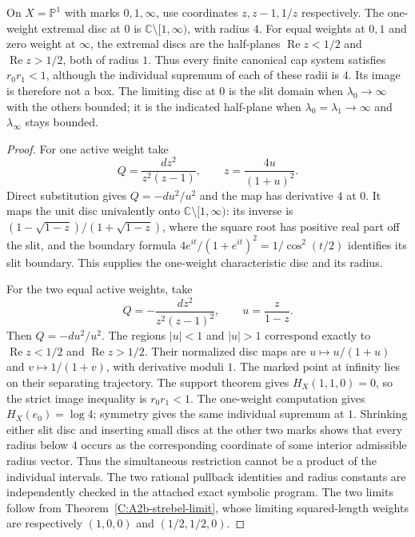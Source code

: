 \begin{proposition}
\label{C:A2b-pants-extremes}
On $X=\mathbb P^1$ with marks $0,1,\infty$, use coordinates $z,z-1,1/z$ respectively. The one-weight extremal disc at $0$ is $\mathbb C\setminus[1,\infty)$, with radius $4$. For equal weights at $0,1$ and zero weight at $\infty$, the extremal discs are the half-planes $\operatorname{Re}z<1/2$ and $\operatorname{Re}z>1/2$, both of radius $1$. Thus every finite canonical cap system satisfies $r_0r_1<1$, although the individual supremum of each of these radii is $4$. Its image is therefore not a box. The limiting disc at $0$ is the slit domain when $\lambda_0\to\infty$ with the others bounded; it is the indicated half-plane when $\lambda_0=\lambda_1\to\infty$ and $\lambda_\infty$ stays bounded.
\end{proposition}
\begin{proof}
For one active weight take
\[
 Q=\frac{dz^2}{z^2(z-1)},\qquad
 z=\frac{4u}{(1+u)^2}.
\]
Direct substitution gives $Q=-du^2/u^2$ and the map has derivative $4$ at $0$. It maps the unit disc univalently onto $\mathbb C\setminus[1,\infty)$: its inverse is $(1-\sqrt{1-z})/(1+\sqrt{1-z})$, where the square root has positive real part off the slit, and the boundary formula $4e^{it}/(1+e^{it})^2=1/\cos^2(t/2)$ identifies its slit boundary. This supplies the one-weight characteristic disc and its radius.

For the two equal active weights, take
\[
 Q=-\frac{dz^2}{z^2(z-1)^2},\qquad u=\frac{z}{1-z}.
\]
Then $Q=-du^2/u^2$. The regions $|u|<1$ and $|u|>1$ correspond exactly to $\operatorname{Re}z<1/2$ and $\operatorname{Re}z>1/2$. Their normalized disc maps are $u\mapsto u/(1+u)$ and $v\mapsto1/(1+v)$, with derivative moduli $1$. The marked point at infinity lies on their separating trajectory. The support theorem gives $H_X(1,1,0)=0$, so the strict image inequality is $r_0r_1<1$. The one-weight computation gives $H_X(e_0)=\log4$; symmetry gives the same individual supremum at $1$. Shrinking either slit disc and inserting small discs at the other two marks shows that every radius below $4$ occurs as the corresponding coordinate of some interior admissible radius vector. Thus the simultaneous restriction cannot be a product of the individual intervals. The two rational pullback identities and radius constants are independently checked in the attached exact symbolic program. The two limits follow from Theorem~\ref{C:A2b-strebel-limit}, whose limiting squared-length weights are respectively $(1,0,0)$ and $(1/2,1/2,0)$.
\end{proof}

